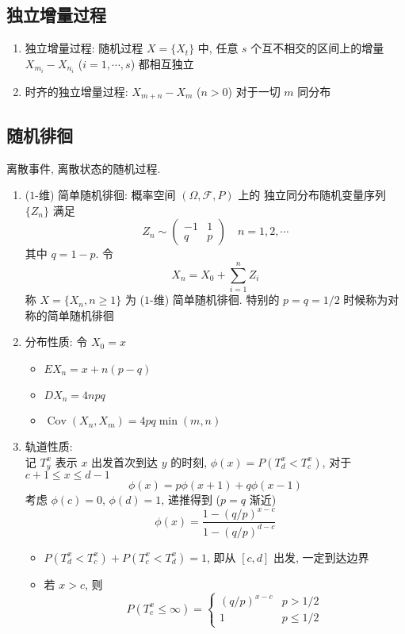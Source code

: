 \documentclass[11pt,a4paper,twocolumn]{article} %
\numberwithin{equation}{section} %
\DeclareMathOperator\cov{Cov}
\begin{document}
\subsection{独立增量过程} %
\label{sub:indenpendent_increase}
\begin{enumerate}
	\item 独立增量过程: 随机过程 $X =\{X_t\}$ 中, 
	任意 $s$ 个互不相交的区间上的增量 $X_{m_i} - X_{n_i}$ ($i = 1, \cdots, s$) 
	都相互独立
	\item 时齐的独立增量过程: $X_{m+n} - X_m$ ($n>0$) 对于一切 $m$ 同分布
\end{enumerate}
\subsection{随机徘徊} %
\label{sub:random_walk}
离散事件, 离散状态的随机过程. 
\begin{enumerate}
	\item ($1$-维) 简单随机徘徊: 概率空间 $(\Omega, \mathscr F, P)$ 上的
	独立同分布随机变量序列 $\{Z_n\}$ 满足
	$$
		Z_n\sim \begin{pmatrix}
			-1 & 1 \\
			q  & p
		\end{pmatrix}\quad {n = 1, 2, \cdots}
	$$
	其中 $q = 1-p$. 令
	$$
		X_n = X_0 + \sum_{i=1}^n Z_i
	$$
	称 $X = \{X_n, n\ge 1\}$ 为 ($1$-维) 简单随机徘徊. 
	特别的 $p=q=1/2$ 时候称为对称的简单随机徘徊
	\item 分布性质: 令 $X_0 = x$
	\begin{itemize}
		\item $EX_n = x + n(p-q)$
		\item $DX_n = 4npq$
		\item $\cov(X_n, X_m) = 4pq\min(m,n)$
	\end{itemize}
	\item 轨道性质: \\
	记 $T_y^x$ 表示 $x$ 出发首次到达 $y$ 的时刻, $\phi(x) = P (T_d^x < T_c^x)$, 
	对于 $c+1\le x \le d-1$
	$$
	\phi(x) = p\phi(x+1) + q\phi(x-1)
	$$
	考虑 $\phi(c) = 0$, $\phi(d) = 1$, 递推得到 ($p=q$ 渐近)
	$$
		\phi(x) = 
		\frac{1-\left(q/p\right)^{x-c}}{1-\left(q/p\right)^{d-c}}
	$$
	\begin{itemize}
		\item $P (T_d^x < T_c^x) + P (T_c^x < T_d^x) = 1$, 即从 $[c,d]$ 出发, 
		一定到达边界
		\item 若 $x>c$, 则
		$$
		P(T_c^x \le \infty) = \begin{cases}
			(q/p)^{x-c} & p>1/2 \\
			1 & p\le 1/2
		\end{cases}
		$$
	\end{itemize}
\end{enumerate}
\end{document}
